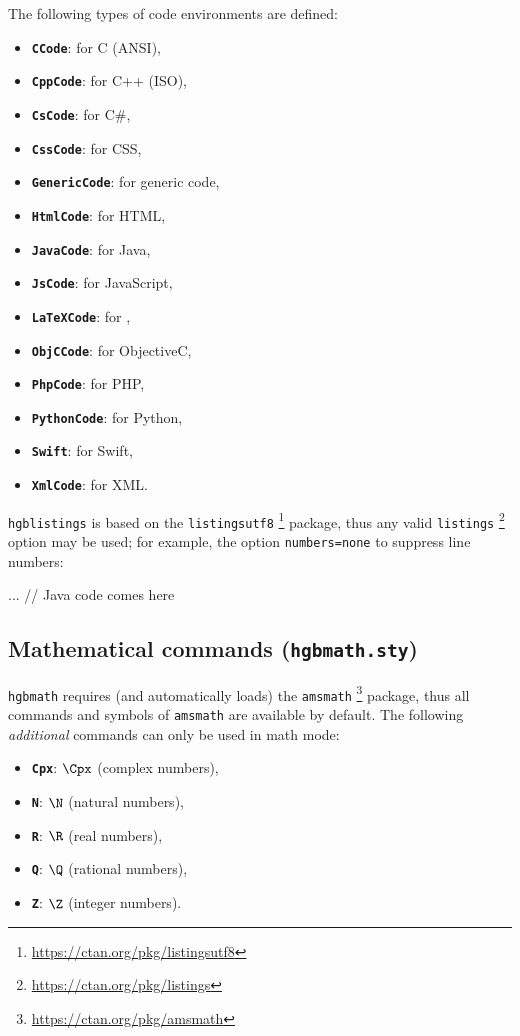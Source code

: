 \documentclass[english]{hgbarticle}
\begin{document}
The following types of code environments are defined:%
%
\begin{itemize}
    \item \textbf{\texttt{CCode}}: for C (ANSI),
    \item \textbf{\texttt{CppCode}}: for C++ (ISO),
    \item \textbf{\texttt{CsCode}}: for C\#,
    \item \textbf{\texttt{CssCode}}: for CSS,
    \item \textbf{\texttt{GenericCode}}: for generic code,
    \item \textbf{\texttt{HtmlCode}}: for HTML,
    \item \textbf{\texttt{JavaCode}}: for Java,
    \item \textbf{\texttt{JsCode}}: for JavaScript,
    \item \textbf{\texttt{LaTeXCode}}: for \latex,
    \item \textbf{\texttt{ObjCCode}}: for ObjectiveC,
    \item \textbf{\texttt{PhpCode}}: for PHP,
    \item \textbf{\texttt{PythonCode}}: for Python,
    \item \textbf{\texttt{Swift}}: for Swift,
    \item \textbf{\texttt{XmlCode}}: for XML.
\end{itemize}
%
\texttt{hgblistings} is based on the \texttt{listingsutf8}%
\footnote{\url{https://ctan.org/pkg/listingsutf8}}
package, thus any valid \texttt{listings}%
\footnote{\url{https://ctan.org/pkg/listings}}
option may be used; for example, the option \texttt{numbers=none} to suppress
line numbers:
\begin{LaTeXCode}[numbers=none]
    \begin{JavaCode}[numbers=none]
    ... // Java code comes here
    \end{JavaCode}
\end{LaTeXCode}


\subsection{Mathematical commands (\texttt{hgbmath.sty})}

\texttt{hgbmath} requires (and automatically loads) the \texttt{amsmath}%
\footnote{\url{https://ctan.org/pkg/amsmath}}
package, thus all commands and symbols of \texttt{amsmath} are available by
default. The following \emph{additional} commands can only be used in math mode:
%
\begin{itemize}
    \item \textbf{\texttt{{\bs}Cpx}}: $\Cpx$ (complex numbers),
    \item \textbf{\texttt{{\bs}N}}: $\N$ (natural numbers),
    \item \textbf{\texttt{{\bs}R}}: $\R$ (real numbers),
    \item \textbf{\texttt{{\bs}Q}}: $\Q$ (rational numbers),
    \item \textbf{\texttt{{\bs}Z}}: $\Z$ (integer numbers).
\end{itemize}
\end{document}

